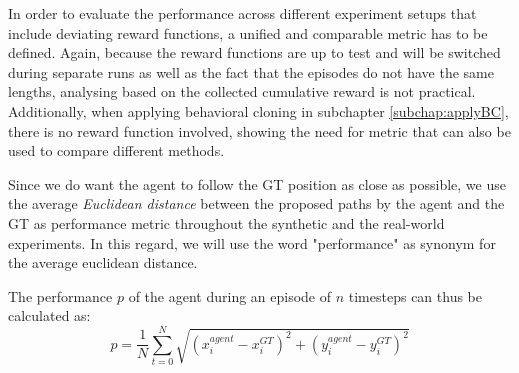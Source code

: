 In order to evaluate the performance across different experiment setups that include deviating reward functions, a unified and comparable metric has to be defined. Again, because the reward functions are up to test and will be switched during separate runs as well as the fact that the episodes do not have the same lengths, analysing based on the collected cumulative reward is not practical. Additionally, when applying behavioral cloning in subchapter \ref{subchap:applyBC}, there is no reward function involved, showing the need for metric that can also be used to compare different methods.
\par
Since we do want the agent to follow the GT position as close as possible, we use the average \textit{Euclidean distance} between the proposed paths by the agent and the GT as performance metric throughout the synthetic and the real-world experiments. In this regard, we will use the word "performance" as synonym for the average euclidean distance.
\par
The performance $p$ of the agent during an episode of $n$ timesteps can thus be calculated as:
\begin{equation}
    p = \frac{1}{N} \sum_{t=0}^{N}\sqrt{(x^{agent}_i - x^{GT}_i)^2 + (y^{agent}_i - y^{GT}_i)^2}
    \label{eq:euclid}
\end{equation}

